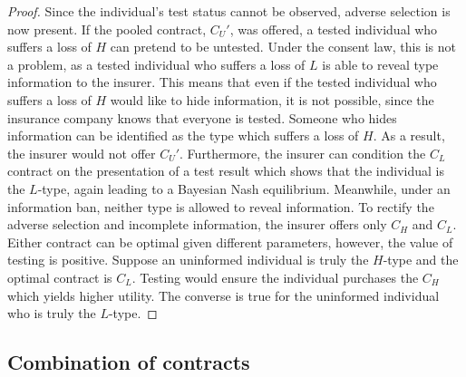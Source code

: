 \documentclass[nonatbib,preprint,12pt]{elsarticle}
\theoremstyle{plain}
\theoremstyle{definition}
\theoremstyle{plain}
\theoremstyle{TheoremNum}
\theoremstyle{CorollaryNum}
\theoremstyle{PropositionNum}
\theoremstyle{TheoremNum}
\begin{document}
\begin{proof}
Since the individual's test status cannot be observed, adverse selection is now present. If the pooled contract, $C_U'$, was offered, a tested individual who suffers a loss of $H$ can pretend to be untested. Under the consent law, this is not a problem, as a tested individual who suffers a loss of $L$ is able to reveal type information to the insurer. This means that even if the tested individual who suffers a loss of $H$ would like to hide information, it is not possible, since the insurance company knows that everyone is tested. Someone who hides information can be identified as the type which suffers a loss of $H$. As a result, the insurer would not offer $C_U'$. Furthermore, the insurer can condition the $C_L$ contract on the presentation of a test result which shows that the individual is the $L$-type, again leading to a Bayesian Nash equilibrium. Meanwhile, under an information ban, neither type is allowed to reveal information. To rectify the adverse selection and incomplete information, the insurer offers only $C_H$ and $C_L$. Either contract can be optimal given different parameters, however, the value of testing is positive. Suppose an uninformed individual is truly the $H$-type and the optimal contract is $C_L$. Testing would ensure the individual purchases the $C_H$ which yields higher utility. The converse is true for the uninformed individual who is truly the $L$-type. 
\end{proof}


\subsection{Combination of contracts}
\end{document}
